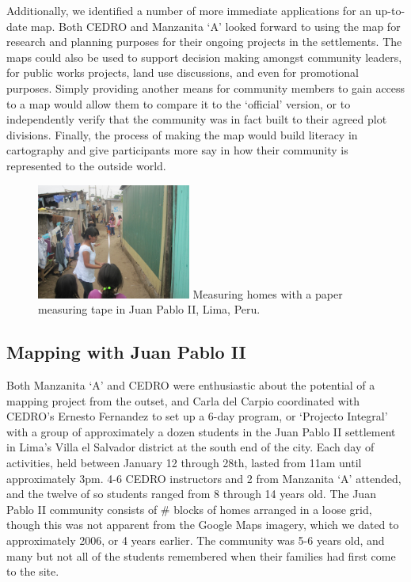 \documentclass[11pt]{report}
\begin{document}
Additionally, we identified a number of more immediate applications for an up-to-date map. Both CEDRO and Manzanita `A' looked forward to using the map for research and planning purposes for their ongoing projects in the settlements. The maps could also be used to support decision making amongst community leaders, for public works projects, land use discussions, and even for promotional purposes. Simply providing another means for community members to gain access to a map would allow them to compare it to the `official' version, or to independently verify that the community was in fact built to their agreed plot divisions. Finally, the process of making the map would build literacy in cartography and give participants more say in how their community is represented to the outside world.  

\begin{figure}
	\begin{flushright}
		\includegraphics[width=0.45\textwidth]{images/juan-pablo-measuring.jpg}
		Measuring homes with a paper measuring tape in Juan Pablo II, Lima, Peru.
	\end{flushright}
\end{figure}

\subsection{Mapping with Juan Pablo II}

Both Manzanita `A' and CEDRO were enthusiastic about the potential of a mapping project from the outset, and Carla del Carpio coordinated with CEDRO's Ernesto Fernandez to set up a 6-day program, or `Projecto Integral' with a group of approximately a dozen students in the Juan Pablo II settlement in Lima's Villa el Salvador district at the south end of the city. Each day of activities, held between January 12 through 28th, lasted from 11am until approximately 3pm. 4-6 CEDRO instructors and 2 from Manzanita `A' attended, and the twelve of so students ranged from 8 through 14 years old. The Juan Pablo II community consists of \# blocks of homes arranged in a loose grid, though this was not apparent from the Google Maps imagery, which we dated to approximately 2006, or 4 years earlier. The community was 5-6 years old, and many but not all of the students remembered when their families had first come to the site. 
\end{document}
